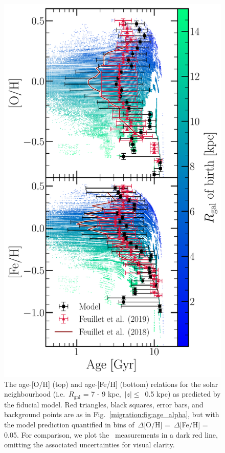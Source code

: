 \begin{figure} 
\centering 
\includegraphics[scale = 0.5]{amr_solar_annulus.pdf} 
\caption{The age-[O/H] (top) and age-[Fe/H] (bottom) relations for the solar 
neighbourhood (i.e.~$R_\text{gal}$ = 7 - 9 kpc,~$\left|z\right|\leq$~0.5 kpc) 
as predicted by the fiducial model. Red triangles, black squares, error bars, 
and background points are as in Fig.~\ref{migration:fig:age_alpha}, but with the model 
prediction quantified in bins of~$\Delta$[O/H] =~$\Delta$[Fe/H] = 0.05. For 
comparison, we plot the~\citet{Feuillet2018} measurements in a dark red line, 
omitting the associated uncertainties for visual clarity. } 
\label{migration:fig:amr_solar_annulus} 
\end{figure} 

